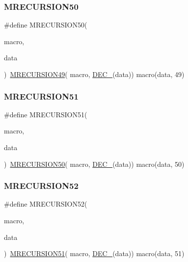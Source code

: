 \subsubsection{\texorpdfstring{MRECURSION50}{MRECURSION50}}
{\footnotesize\ttfamily \#define M\+R\+E\+C\+U\+R\+S\+I\+O\+N50(\begin{DoxyParamCaption}\item[{}]{macro,  }\item[{}]{data }\end{DoxyParamCaption})~\mbox{\hyperlink{group__group__sam0__utils__mrecursion_ga6b1985491fecb7655f97651ce16eb3c0}{M\+R\+E\+C\+U\+R\+S\+I\+O\+N49}}(  macro, \mbox{\hyperlink{group__group__sam0__utils__mrecursion_ga1d23d683797679dca8c3512a54a5dcae}{D\+E\+C\+\_\+}}(data))   macro(data, 49)}

\mbox{\label{group__group__sam0__utils__mrecursion_ga6e7ba2940484a6723ca0f5a6c844ba89}} 
\subsubsection{\texorpdfstring{MRECURSION51}{MRECURSION51}}
{\footnotesize\ttfamily \#define M\+R\+E\+C\+U\+R\+S\+I\+O\+N51(\begin{DoxyParamCaption}\item[{}]{macro,  }\item[{}]{data }\end{DoxyParamCaption})~\mbox{\hyperlink{group__group__sam0__utils__mrecursion_gadda406cbee1fde1ebddb8671c858981c}{M\+R\+E\+C\+U\+R\+S\+I\+O\+N50}}(  macro, \mbox{\hyperlink{group__group__sam0__utils__mrecursion_ga1d23d683797679dca8c3512a54a5dcae}{D\+E\+C\+\_\+}}(data))   macro(data, 50)}

\mbox{\label{group__group__sam0__utils__mrecursion_ga168834cb335f274f04d497f16f7b3289}} 
\subsubsection{\texorpdfstring{MRECURSION52}{MRECURSION52}}
{\footnotesize\ttfamily \#define M\+R\+E\+C\+U\+R\+S\+I\+O\+N52(\begin{DoxyParamCaption}\item[{}]{macro,  }\item[{}]{data }\end{DoxyParamCaption})~\mbox{\hyperlink{group__group__sam0__utils__mrecursion_ga6e7ba2940484a6723ca0f5a6c844ba89}{M\+R\+E\+C\+U\+R\+S\+I\+O\+N51}}(  macro, \mbox{\hyperlink{group__group__sam0__utils__mrecursion_ga1d23d683797679dca8c3512a54a5dcae}{D\+E\+C\+\_\+}}(data))   macro(data, 51)}

